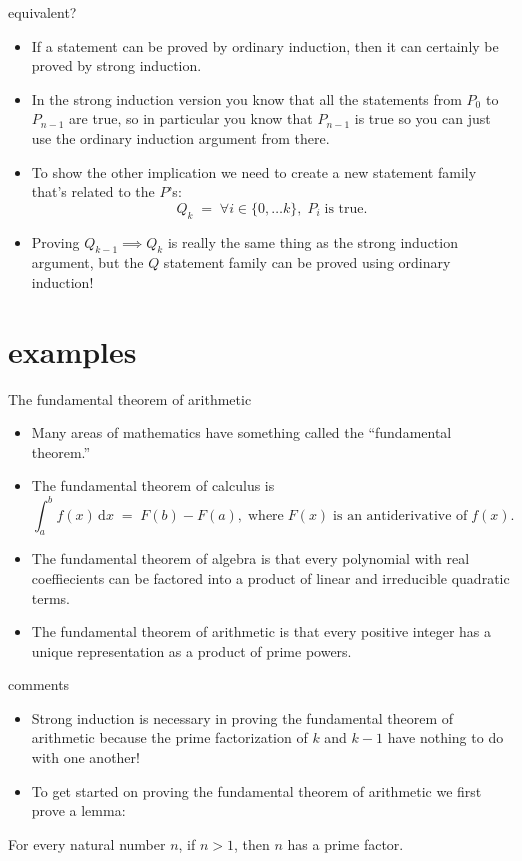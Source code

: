 \documentclass[handout,landscape]{beamer}
\newcommand{\dx}{\,\mbox{d}x}
\begin{document}
\begin{frame}{equivalent?}
\begin{itemize}
\item If a statement can be proved by ordinary induction, then it can certainly be proved by strong induction. \pause
\item In the strong induction version you know that all the statements from $P_0$ to $P_{n-1}$ are true,\pause \newline
 so in particular you know that $P_{n-1}$ is true \pause \newline
so you can just use the ordinary induction argument from there. \pause
\item To show the other implication we need to create a new statement family that's related to the $P$'s: \pause
\[ Q_k \; = \; \forall i \in \{0, \ldots k\}, \; P_i \; \mbox{is true.} \] \pause
\item Proving $Q_{k-1} \implies Q_k$ is really the same thing as the strong induction argument, but the $Q$ statement family can be proved using ordinary induction!
\end{itemize}
\end{frame}

\section{examples}

\begin{frame}{The fundamental theorem of arithmetic}
\begin{itemize}
\item Many areas of mathematics have something called the ``fundamental theorem.'' \pause
\item The fundamental theorem of calculus is
\[ \int_a^b f(x) \dx \; = \; F(b) - F(a), \; \mbox{where} \; F(x) \; \mbox{is an antiderivative of} \; f(x).\] \pause
\item The fundamental theorem of algebra is that every polynomial with real coeffiecients can be factored into a product of linear and irreducible quadratic terms. \pause
\item The fundamental theorem of arithmetic is that every positive integer has a unique representation as a product of prime powers. 

\end{itemize}
\end{frame}

\begin{frame}{comments}
\begin{itemize}
\item Strong induction is necessary in proving the fundamental theorem of arithmetic because the prime factorization of $k$ and $k-1$ have nothing to do with one another! \pause
\item To get started on proving the fundamental theorem of arithmetic we first prove a lemma: \pause
\end{itemize}

\begin{lem*}
For every natural number $n$, if $n>1$, then $n$ has a prime factor.
\end{lem*}
\end{frame}
\end{document}
